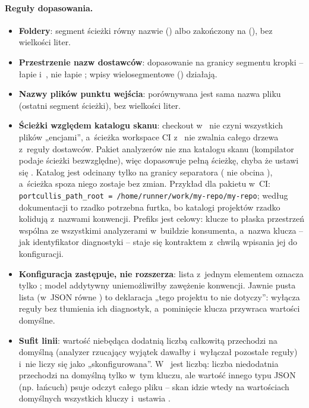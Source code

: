 \paragraph{Reguły dopasowania.}
\begin{itemize}[leftmargin=*]
  \item \textbf{Foldery}: segment ścieżki równy nazwie () albo zakończony
        na  (), bez wielkości liter.
  \item \textbf{Przestrzenie nazw dostawców}: dopasowanie na granicy segmentu kropki --
         łapie  i~,
        nie łapie ; wpisy wielosegmentowe
        () działają.
  \item \textbf{Nazwy plików punktu wejścia}: porównywana jest sama nazwa pliku (ostatni
        segment ścieżki), bez wielkości liter.
  \item \textbf{Ścieżki względem katalogu skanu}: checkout w~
        nie czyni wszystkich plików „encjami”, a~ścieżka workspace CI z~
        nie zwalnia całego drzewa z~reguły dostawców. Pakiet analyzerów nie zna katalogu
        skanu (kompilator podaje ścieżki bezwzględne), więc dopasowuje pełną ścieżkę, chyba
        że ustawi się . Katalog jest odcinany tylko na
        granicy separatora ( nie obcina ),
        a~ścieżka spoza niego zostaje bez zmian. Przykład dla pakietu w~CI:
        \texttt{portcullis\_path\_root = /home/runner/work/my-repo/my-repo}; według
        dokumentacji to rzadko potrzebna furtka, bo katalogi projektów rzadko kolidują
        z~nazwami konwencji. Prefiks  jest celowy: klucze
         to płaska przestrzeń wspólna ze wszystkimi analyzerami
        w~buildzie konsumenta, a~nazwa klucza -- jak identyfikator diagnostyki -- staje się
        kontraktem z~chwilą wpisania jej do konfiguracji.
  \item \textbf{Konfiguracja zastępuje, nie rozszerza}: lista z~jednym elementem
         oznacza tylko ; model addytywny uniemożliwiłby
        zawężenie konwencji. Jawnie pusta lista (w~JSON  równe
        \repopath{[]}) to deklaracja „tego projektu to nie dotyczy”: wyłącza reguły bez
        tłumienia ich diagnostyk, a~pominięcie klucza przywraca wartości domyślne.
  \item \textbf{Sufit linii}: wartość niebędąca dodatnią liczbą całkowitą przechodzi na
        domyślną (analyzer rzucający wyjątek dawałby  i~wyłączał pozostałe
        reguły) i~nie liczy się jako „skonfigurowana”. W~
         jest liczbą: liczba niedodatnia przechodzi na domyślną
        tylko w~tym kluczu, ale wartość innego typu JSON (np. łańcuch) psuje odczyt całego
        pliku -- skan idzie wtedy na wartościach domyślnych wszystkich kluczy i~ustawia
        .
\end{itemize}

